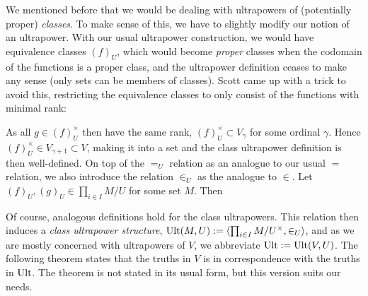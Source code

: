 We mentioned before that we would be dealing with ultrapowers of (potentially proper) \textit{classes}. To make sense of this, we have to slightly modify our notion of an ultrapower. With our usual ultrapower construction, we would have equivalence classes $(f)_U$, which would become \textit{proper} classes when the codomain of the functions is a proper class, and the ultrapower definition ceases to make any sense (only sets can be members of classes). Scott came up with a trick to avoid this, restricting the equivalence classes to only consist of the functions with minimal rank:


As all $g\in(f)_U^\times$ then have the same rank, $(f)_U^\times\subset V_\gamma$ for some ordinal $\gamma$. Hence $(f)_U^\times\in V_{\gamma+1}\subset V$, making it into a set and the class ultrapower definition is then well-defined. On top of the $=_U$ relation as an analogue to our usual $=$ relation, we also introduce the relation $\in_U$ as the analogue to $\in$. Let $(f)_U,(g)_U\in\prod_{i\in I}M/U$ for some set $M$. Then

Of course, analogous definitions hold for the class ultrapowers. This relation then induces a \textit{class ultrapower structure}, $\operatorname{Ult}(M,U):=\langle \prod_{i\in I}M/U^\times,\in_U\rangle$, and as we are mostly concerned with ultrapowers of $V$, we abbreviate $\operatorname{Ult}:=\operatorname{Ult}(V,U)$. The following theorem states that the truths in $V$ is in correspondence with the truths in $\operatorname{Ult}$. The theorem is not stated in its usual form, but this version suits our needs.

